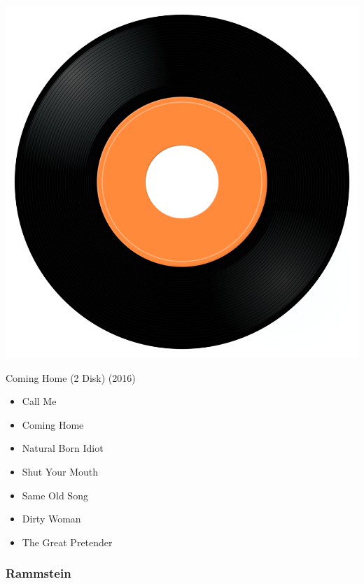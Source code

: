 \begin{minipage}[t]{0.25\textwidth}
\captionsetup{type=figure}
\includegraphics[width=\textwidth]{Images/cover.png}
\caption*{Coming Home (2 Disk) (2016)}
\end{minipage}
\begin{minipage}[t]{0.25\textwidth}\vspace{0pt}
\begin{itemize}[nosep,leftmargin=1em,labelwidth=*,align=left]
	\setlength{\itemsep}{0pt}
	\item Call Me
	\item Coming Home
	\item Natural Born Idiot
	\item Shut Your Mouth 
	\item Same Old Song
	\item Dirty Woman
	\item The Great Pretender
\end{itemize}
\end{minipage}

\subsubsection{Rammstein}

